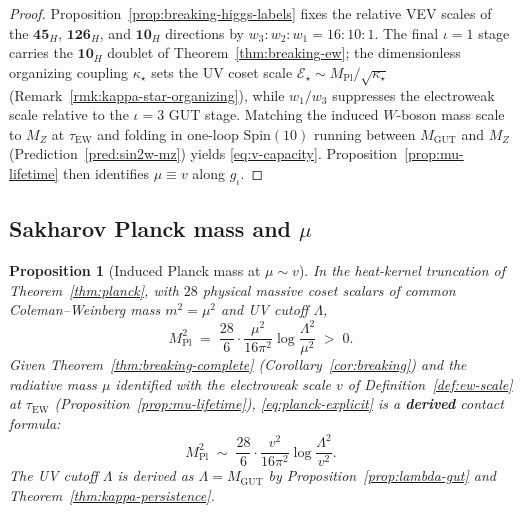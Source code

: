 \documentclass[aps,prd,onecolumn,amsmath,amssymb,nofootinbib,11pt]{revtex4-2}
\numberwithin{equation}{section}
\theoremstyle{plain}
\newtheorem{proposition}[theorem]{Proposition}
\theoremstyle{definition}
\theoremstyle{remark}
\newcommand{\Spin}{\mathrm{Spin}}
\newcommand{\MPl}{M_{\mathrm{Pl}}}
\begin{document}
\begin{proof}
Proposition~\ref{prop:breaking-higgs-labels} fixes the relative VEV scales of
the $\mathbf{45}_H$, $\mathbf{126}_H$, and $\mathbf{10}_H$ directions by
$w_3:w_2:w_1=16:10:1$. The final $\iota=1$ stage carries the
$\mathbf{10}_H$ doublet of Theorem~\ref{thm:breaking-ew}; the dimensionless
organizing coupling $\kappa_\star$ sets the UV coset scale
$\mathcal{E}_\star\sim\MPl/\sqrt{\kappa_\star}$ (Remark~\ref{rmk:kappa-star-organizing}),
while $w_1/w_3$ suppresses the electroweak scale relative to the
$\iota=3$ GUT stage. Matching the induced $W$-boson mass scale to $M_Z$ at
$\tau_{\mathrm{EW}}$ and folding in one-loop $\Spin(10)$ running between
$M_{\mathrm{GUT}}$ and $M_Z$ (Prediction~\ref{pred:sin2w-mz}) yields
\eqref{eq:v-capacity}. Proposition~\ref{prop:mu-lifetime} then identifies
$\mu\equiv v$ along $g_\iota$.
\end{proof}

\subsection{Sakharov Planck mass and $\mu$}
\label{sec:scales:planck}

\begin{proposition}[Induced Planck mass at $\mu\sim v$]
\label{prop:planck-scale}
In the heat-kernel truncation of Theorem~\ref{thm:planck}, with $28$ physical
massive coset scalars of common Coleman--Weinberg mass $m^2=\mu^2$ and UV
cutoff $\Lambda$,
\begin{equation}\label{eq:planck-explicit}
  \MPl^2
  \;=\;
  \frac{28}{6}\cdot\frac{\mu^2}{16\pi^2}
  \log\frac{\Lambda^2}{\mu^2}
  \;>\;0.
\end{equation}
Given Theorem~\ref{thm:breaking-complete} (Corollary~\ref{cor:breaking}) and
the radiative mass $\mu$ identified with the electroweak scale $v$ of
Definition~\ref{def:ew-scale} at $\tau_{\mathrm{EW}}$
(Proposition~\ref{prop:mu-lifetime}), \eqref{eq:planck-explicit} is a
\textbf{derived} contact formula:
\begin{equation}\label{eq:planck-v}
  \MPl^2
  \;\sim\;
  \frac{28}{6}\cdot\frac{v^2}{16\pi^2}
  \log\frac{\Lambda^2}{v^2}.
\end{equation}
The UV cutoff $\Lambda$ is derived as $\Lambda=M_{\mathrm{GUT}}$ by
Proposition~\ref{prop:lambda-gut} and Theorem~\ref{thm:kappa-persistence}.
\end{proposition}
\end{document}
